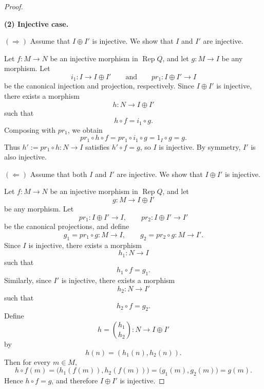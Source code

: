 \documentclass[11pt, a4paper]{report}
\begin{document}
\begin{proof}
\begin{center}
\end{center}

\medskip

\noindent\textbf{(2) Injective case.}

\smallskip

\noindent
$(\Rightarrow)$ Assume that $I \oplus I'$ is injective. We show that $I$ and $I'$ are injective.

Let $f:M \to N$ be an injective morphism in $\operatorname{Rep}Q$, and let
$g:M \to I$ be any morphism. Let
\[
i_1:I \to I \oplus I'
\qquad\text{and}\qquad
pr_1:I \oplus I' \to I
\]
be the canonical injection and projection, respectively. Since $I \oplus I'$ is injective,
there exists a morphism
\[
h:N \to I \oplus I'
\]
such that
\[
h \circ f = i_1 \circ g.
\]
Composing with $pr_1$, we obtain
\[
pr_1 \circ h \circ f
=
pr_1 \circ i_1 \circ g
=
1_I \circ g
=
g.
\]
Thus $h' := pr_1 \circ h : N \to I$ satisfies $h' \circ f = g$, so $I$ is injective.
By symmetry, $I'$ is also injective.

\begin{center}
\end{center}

\smallskip

\noindent
$(\Leftarrow)$ Assume that both $I$ and $I'$ are injective. We show that $I \oplus I'$ is injective.

Let $f:M \to N$ be an injective morphism in $\operatorname{Rep}Q$, and let
\[
g:M \to I \oplus I'
\]
be any morphism. Let
\[
pr_1:I \oplus I' \to I,
\qquad
pr_2:I \oplus I' \to I'
\]
be the canonical projections, and define
\[
g_1=pr_1 \circ g:M \to I,
\qquad
g_2=pr_2 \circ g:M \to I'.
\]
Since $I$ is injective, there exists a morphism
\[
h_1:N \to I
\]
such that
\[
h_1 \circ f = g_1.
\]
Similarly, since $I'$ is injective, there exists a morphism
\[
h_2:N \to I'
\]
such that
\[
h_2 \circ f = g_2.
\]
Define
\[
h=\binom{h_1}{h_2}:N \to I \oplus I'
\]
by
\[
h(n)=(h_1(n),h_2(n)).
\]
Then for every $m \in M$,
\[
h \circ f(m)
=
\bigl(h_1(f(m)),h_2(f(m))\bigr)
=
\bigl(g_1(m),g_2(m)\bigr)
=
g(m).
\]
Hence $h \circ f=g$, and therefore $I \oplus I'$ is injective.


\end{proof}
\end{document}
